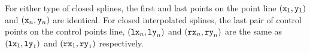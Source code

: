 For either type of closed splines, the first and last points
on the point line
	$({\tt x}_1, {\tt y}_1)$ and $({\tt x}_n, {\tt y}_n)$
	are identical.
For closed interpolated splines, the last pair of control points on the
control points line,
	$({\tt lx}_n, {\tt ly}_n)$ and $({\tt rx}_n, {\tt ry}_n)$
	are the same as
	$({\tt lx}_1, {\tt ly}_1)$ and $({\tt rx}_1, {\tt ry}_1)$
	respectively.


